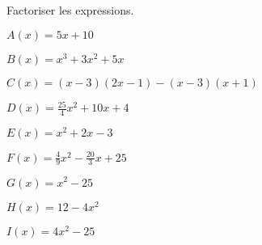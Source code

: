 
Factoriser les expressions.
\ \\

\begin{minipage}{5.5cm}
\begin{description}
\item $A(x)=5x+10$
\item $B(x)=x^3+3x^2+5x$
\item $C(x)=(x-3)(2x-1)-(x-3)(x+1)$   
\end{description}
\end{minipage}
\begin{minipage}{5.5cm}
\begin{description}
\item $D(x)=\frac{25}{4}x^2+10x+4$ 
\item $E(x)=x^2+2x-3$ 
\item $F(x)=\frac{4}{9}x^2-\frac{20}{3}x+25$ 
\end{description}
\end{minipage}
\begin{minipage}{5.5cm}
\begin{description}
\item $G(x)=x^2-25$ 
\item $H(x)=12-4x^2$ 
\item $I(x)=4x^2-25$ 
\end{description}
\end{minipage}